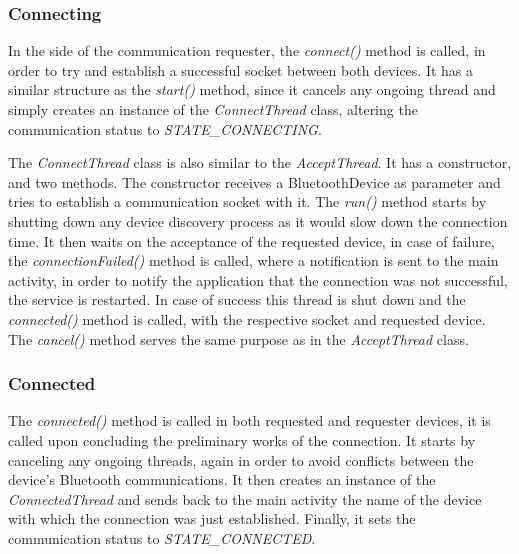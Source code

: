 \subsubsection{Connecting}
\label{subsubsec:connecting}

In the side of the communication requester, the \textit{connect()} method is called, in order to try and establish a successful socket between both devices. It has a similar structure as the \textit{start()} method, since it cancels any ongoing thread and simply creates an instance of the \textit{ConnectThread} class, altering the communication status to \textit{STATE\_CONNECTING}.

The \textit{ConnectThread} class is also similar to the \textit{AcceptThread}. It has a constructor, and two methods. The constructor receives a BluetoothDevice as parameter and tries to establish a communication socket with it. The \textit{run()} method starts by shutting down any device discovery process as it would slow down the connection time. It then waits on the acceptance of the requested device, in case of failure, the \textit{connectionFailed()} method is called, where a notification is sent to the main activity, in order to notify the application that the connection was not successful, the service is restarted. In case of success this thread is shut down and the \textit{connected()} method is called, with the respective socket and requested device. The \textit{cancel()} method serves the same purpose as in the \textit{AcceptThread} class.

\subsubsection{Connected}
\label{subsubsec:connected}

The \textit{connected()} method is called in both requested and requester devices, it is called upon concluding the preliminary works of the connection. It starts by canceling any ongoing threads, again in order to avoid conflicts between the device's Bluetooth communications. It then creates an instance of the \textit{ConnectedThread} and sends back to the main activity the name of the device with which the connection was just established. Finally, it sets the communication status to \textit{STATE\_CONNECTED}.

